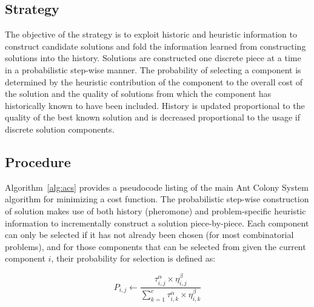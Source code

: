 \subsection{Strategy}
The objective of the strategy is to exploit historic and heuristic information to construct candidate solutions and fold the information learned from constructing solutions into the history.
Solutions are constructed one discrete piece at a time in a probabilistic step-wise manner. The probability of selecting a component is determined by the heuristic contribution of the component to the overall cost of the solution and the quality of solutions from which the component has historically known to have been included. History is updated proportional to the quality of the best known solution and is decreased proportional to the usage if discrete solution components.

\subsection{Procedure}
Algorithm~\ref{alg:acs} provides a pseudocode listing of the main Ant Colony System algorithm for minimizing a cost function. 
The probabilistic step-wise construction of solution makes use of both history (pheromone) and problem-specific heuristic information to incrementally construct a solution piece-by-piece. Each component can only be selected if it has not already been chosen (for most combinatorial problems), and for those components that can  be selected from given the current component $i$, their probability for selection is defined as:

\begin{equation}
P_{i,j} \leftarrow \frac{\tau_{i,j}^{\alpha} \times \eta_{i,j}^{\beta}}{\sum_{k=1}^c \tau_{i,k}^{\alpha} \times \eta_{i,k}^{\beta}}
\end{equation}

